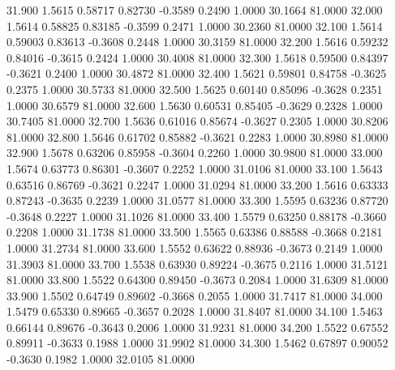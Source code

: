   31.900   1.5615   0.58717   0.82730  -0.3589   0.2490   1.0000  30.1664  81.0000
  32.000   1.5614   0.58825   0.83185  -0.3599   0.2471   1.0000  30.2360  81.0000
  32.100   1.5614   0.59003   0.83613  -0.3608   0.2448   1.0000  30.3159  81.0000
  32.200   1.5616   0.59232   0.84016  -0.3615   0.2424   1.0000  30.4008  81.0000
  32.300   1.5618   0.59500   0.84397  -0.3621   0.2400   1.0000  30.4872  81.0000
  32.400   1.5621   0.59801   0.84758  -0.3625   0.2375   1.0000  30.5733  81.0000
  32.500   1.5625   0.60140   0.85096  -0.3628   0.2351   1.0000  30.6579  81.0000
  32.600   1.5630   0.60531   0.85405  -0.3629   0.2328   1.0000  30.7405  81.0000
  32.700   1.5636   0.61016   0.85674  -0.3627   0.2305   1.0000  30.8206  81.0000
  32.800   1.5646   0.61702   0.85882  -0.3621   0.2283   1.0000  30.8980  81.0000
  32.900   1.5678   0.63206   0.85958  -0.3604   0.2260   1.0000  30.9800  81.0000
  33.000   1.5674   0.63773   0.86301  -0.3607   0.2252   1.0000  31.0106  81.0000
  33.100   1.5643   0.63516   0.86769  -0.3621   0.2247   1.0000  31.0294  81.0000
  33.200   1.5616   0.63333   0.87243  -0.3635   0.2239   1.0000  31.0577  81.0000
  33.300   1.5595   0.63236   0.87720  -0.3648   0.2227   1.0000  31.1026  81.0000
  33.400   1.5579   0.63250   0.88178  -0.3660   0.2208   1.0000  31.1738  81.0000
  33.500   1.5565   0.63386   0.88588  -0.3668   0.2181   1.0000  31.2734  81.0000
  33.600   1.5552   0.63622   0.88936  -0.3673   0.2149   1.0000  31.3903  81.0000
  33.700   1.5538   0.63930   0.89224  -0.3675   0.2116   1.0000  31.5121  81.0000
  33.800   1.5522   0.64300   0.89450  -0.3673   0.2084   1.0000  31.6309  81.0000
  33.900   1.5502   0.64749   0.89602  -0.3668   0.2055   1.0000  31.7417  81.0000
  34.000   1.5479   0.65330   0.89665  -0.3657   0.2028   1.0000  31.8407  81.0000
  34.100   1.5463   0.66144   0.89676  -0.3643   0.2006   1.0000  31.9231  81.0000
  34.200   1.5522   0.67552   0.89911  -0.3633   0.1988   1.0000  31.9902  81.0000
  34.300   1.5462   0.67897   0.90052  -0.3630   0.1982   1.0000  32.0105  81.0000

